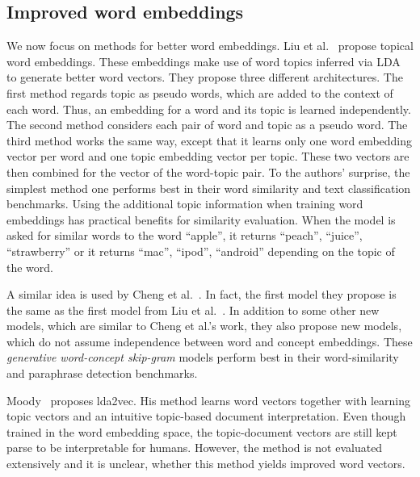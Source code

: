\documentclass[
        a4paper,
        titlepage,
        twoside,
        parskip
        ]{scrbook}
\theoremstyle{break}
\begin{document}
\subsection{Improved word embeddings}
We now focus on methods for better word embeddings.
Liu et al.~\cite{Liu2015} propose topical word embeddings.
These embeddings make use of word topics inferred via LDA to generate better word vectors.
They propose three different architectures.
The first method regards topic as pseudo words, which are added to the context of each word.
Thus, an embedding for a word and its topic is learned independently.
The second method considers each pair of word and topic as a pseudo word.
The third method works the same way, except that it learns only one word embedding vector per word and one topic embedding vector per topic.
These two vectors are then combined for the vector of the word-topic pair.
To the authors' surprise, the simplest method one performs best in their word similarity and text classification benchmarks.
Using the additional topic information when training word embeddings has practical benefits for similarity evaluation.
When the model is asked for similar words to the word ``apple'', it returns ``peach'', ``juice'', ``strawberry'' or it returns ``mac'', ``ipod'', ``android'' depending on the topic of the word.

A similar idea is used by Cheng et al.~\cite{Cheng2015}.
In fact, the first model they propose is the same as the first model from Liu et al.~\cite{Liu2015}.
In addition to some other new models, which are similar to Cheng et al.'s work, they also propose new models, which do not assume independence between word and concept embeddings.
These \emph{generative word-concept skip-gram} models perform best in their word-similarity and paraphrase detection benchmarks.

Moody~\cite{Moody2016} proposes lda2vec.
His method learns word vectors together with learning topic vectors and an intuitive topic-based document interpretation.
Even though trained in the word embedding space, the topic-document vectors are still kept parse to be interpretable for humans.
However, the method is not evaluated extensively and it is unclear, whether this method yields improved word vectors.

\end{document}
